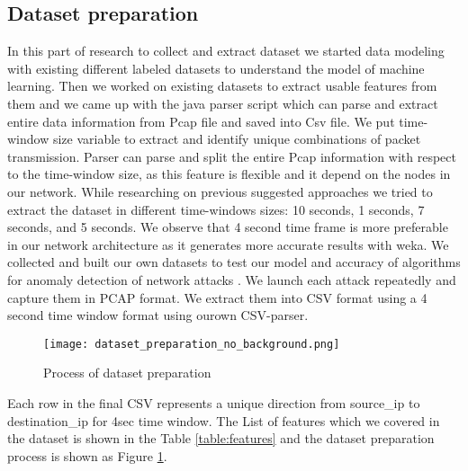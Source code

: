\subsection{Dataset preparation}


In this part of research to collect and extract dataset we started data modeling with existing different labeled datasets to understand the model of machine learning. Then we worked on existing datasets to
extract usable features from them and we came up with the java parser script which can parse and extract entire data information from Pcap file and saved into Csv file. We put time-window size variable to
extract and identify unique combinations of packet transmission. Parser can parse and split the entire Pcap information with respect to the time-window size, as this feature is flexible and it depend on the nodes in our network. While researching on previous suggested
approaches we tried to extract the dataset in different time-windows sizes: 10 seconds, 1 seconds, 7 seconds, and 5 seconds. We observe that 4 second time frame is more preferable in our
network architecture as it generates more accurate results with weka. We collected and built our own datasets to test our model and
accuracy of algorithms for anomaly detection of network attacks \cite{DMnIDS}. We launch each attack repeatedly and capture them in PCAP format. We extract them into CSV format using a 4 second time window format using ourown CSV-parser.

\begin{figure}[h!]
\texttt{[image: dataset\_preparation\_no\_background.png]}
\caption{Process of dataset preparation}
\label{fig:dataset_prepare}
\end{figure}

Each row in the final CSV represents a unique direction from source\_ip to destination\_ip for 4sec time window. The List of features which we covered in the dataset is shown in the Table
\ref{table:features} and the dataset preparation process is shown as Figure \ref{fig:dataset_prepare}.

